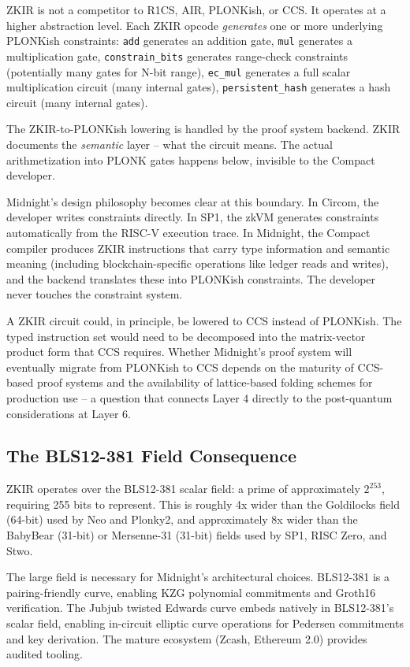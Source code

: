 \documentclass[
  11pt,
  openany]{report}
\begin{document}
ZKIR is not a competitor to R1CS, AIR, PLONKish, or CCS. It operates at a higher
abstraction level. Each ZKIR opcode \emph{generates} one or more underlying
PLONKish constraints: \texttt{add} generates an addition gate, \texttt{mul}
generates a multiplication gate, \texttt{constrain\_bits} generates range-check
constraints (potentially many gates for N-bit range), \texttt{ec\_mul} generates
a full scalar multiplication circuit (many internal gates),
\texttt{persistent\_hash} generates a hash circuit (many internal gates).

The ZKIR-to-PLONKish lowering is handled by the proof system backend. ZKIR
documents the \emph{semantic} layer -- what the circuit means. The actual
arithmetization into PLONK gates happens below, invisible to the Compact
developer.

Midnight's design philosophy becomes clear at this boundary. In Circom, the
developer writes constraints directly. In SP1, the zkVM generates constraints
automatically from the RISC-V execution trace. In Midnight, the Compact compiler
produces ZKIR instructions that carry type information and semantic meaning
(including blockchain-specific operations like ledger reads and writes), and the
backend translates these into PLONKish constraints. The developer never touches
the constraint system.

A ZKIR circuit could, in principle, be lowered to CCS instead of PLONKish. The
typed instruction set would need to be decomposed into the matrix-vector product
form that CCS requires. Whether Midnight's proof system will eventually migrate
from PLONKish to CCS depends on the maturity of CCS-based proof systems and the
availability of lattice-based folding schemes for production use -- a question
that connects Layer 4 directly to the post-quantum considerations at Layer 6.

\subsection{The BLS12-381 Field
Consequence}\label{the-bls12-381-field-consequence}

ZKIR operates over the BLS12-381 scalar field: a prime of approximately
\(2^{253}\), requiring 255 bits to represent. This is roughly 4x wider than the
Goldilocks field (64-bit) used by Neo and Plonky2, and approximately 8x wider
than the BabyBear (31-bit) or Mersenne-31 (31-bit) fields used by SP1, RISC
Zero, and Stwo.

The large field is necessary for Midnight's architectural choices. BLS12-381 is
a pairing-friendly curve, enabling KZG polynomial commitments and Groth16
verification. The Jubjub twisted Edwards curve embeds natively in BLS12-381's
scalar field, enabling in-circuit elliptic curve operations for Pedersen
commitments and key derivation. The mature ecosystem (Zcash, Ethereum 2.0)
provides audited tooling.
\end{document}
